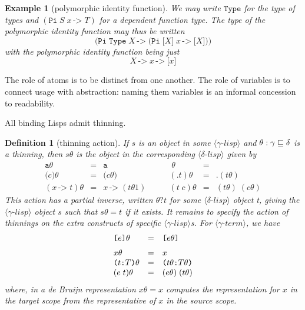 \documentclass{jfp1}
\newtheorem{definition}[theorem]{Definition}
\newtheorem{example}[theorem]{Example}
\newcommand{\A}{\texttt}
\newcommand{\V}{\mathit}
\newcommand{\ab}{\,\texttt{->}\;}
\newcommand{\Pa}[1]{\texttt{(}#1\texttt{)}}
\newcommand{\Bk}[1]{\texttt{[}#1\texttt{]}}
\newcommand{\D}{\texttt{.}}
\newcommand{\GS}[2]{\langle#1\textrm{-}\mathit{#2}\rangle}
\newcommand{\hb}{\texttt{:}}
\newcommand{\ra}[2]{\Pa{#1 \hb #2}}
\begin{document}
\begin{example}[polymorphic identity function]
  We may write $\A{Type}$ for the type of types and $(\A{Pi}\;S\;\V x\ab T)$ for a dependent function type. The type of the polymorphic identity function may thus be written
  \[
    \Pa{\A{Pi}\;\A{Type}\;\V X \ab \Pa{\A{Pi}\;\Bk X\;\V x\ab \Bk X}}
  \]
  with the polymorphic identity function being just
  \[\V X\ab \V x \ab \Bk x
    \]
\end{example}

The role of atoms is to be distinct from one another. The role of variables is to connect usage with abstraction: naming them variables is an informal concession to readability.

All binding Lisps admit thinning.

\begin{definition}[thinning action]
  If $s$ is an object in some $\GS\gamma{lisp}$ and $\theta : \gamma \sqsubseteq \delta$ is a thinning, then $s\theta$ is the object in the corresponding
  $\GS\delta{lisp}$ given by
  \[\begin{array}{lcl}
      \A{a}\theta & = & \A{a} \\
      \Pa c\theta & = & \Pa{c\theta} \\
      (x\ab t)\theta & = & x\ab(t\theta1)
    \end{array}
    \qquad
    \begin{array}{lcl}                     
      \;\theta & = & \;\\
      (\D t)\theta & = & \D(t\theta)\\
      (t\;c)\theta & = & (t\theta)\;(c\theta)
    \end{array}\]
  This action has a partial inverse, written $\theta?t$ for some $\GS\delta{lisp}$ object t, giving the $\GS\gamma{lisp}$ object $s$ such
  that $s\theta = t$ if it exists. 
  It remains to specify the action of thinnings on the extra constructs of specific $\GS\gamma{lisp}$s. For $\GS\gamma{term}$, we have
  \[\begin{array}{lcl}
      \Bk{e}\theta & = & \Bk{e\theta} \medskip \\
      x\theta & = & x \\
      \ra tT\theta & = & \ra{t\theta}{T\theta} \\
      (e\;t)\theta & = & (e\theta)\;(t\theta)
    \end{array}
  \]
  where, in a de Bruijn representation $x\theta = x$ computes the representation for $x$ in the target scope from the representative of
  $x$ in the source scope.
\end{definition}
\end{document}
